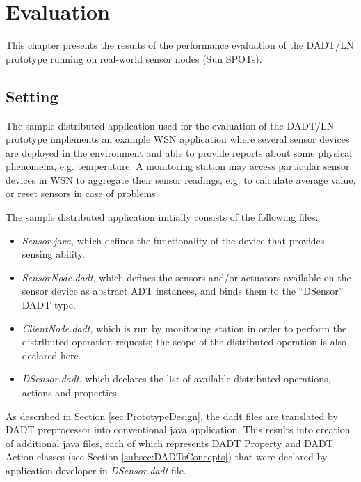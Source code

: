 \chapter{Evaluation} \label{chap:evaluation}

This chapter presents the results of the performance evaluation of the 
DADT/LN prototype running on real-world sensor nodes (Sun SPOTs). 

\section{Setting}


The sample distributed application used for the evaluation of the DADT/LN
prototype 
implements an example WSN application where several sensor devices are deployed
in the environment and able to provide reports about some physical
phenomena, e.g. temperature. A monitoring station may access
particular sensor devices in WSN to aggregate their sensor readings, e.g. to
calculate average value, or reset sensors in case of problems.

The sample distributed application initially consists of the following files:
\begin{itemize}
  \item \emph{Sensor.java}, which defines the functionality of the device
  that provides sensing ability.
  \item \emph{SensorNode.dadt}, which defines the sensors and/or actuators available on the sensor
  device as abstract ADT instances, and binds them to the ``DSensor''  DADT type.
  \item \emph{ClientNode.dadt}, which is run by monitoring station
  in order to perform the distributed operation requests; the scope
  of the distributed operation is also declared here.
  \item \emph{DSensor.dadt}, which declares the list of available
  distributed operations, actions and properties.
\end{itemize}

As described in Section \ref{sec:PrototypeDesign}, the dadt files are translated
by DADT preprocessor into conventional java application. This
results into creation of additional java files, each of which represents DADT
Property and DADT Action classes (see Section \ref{subsec:DADTsConcepts}) that
were declared by application developer in \emph{DSensor.dadt} file. 

